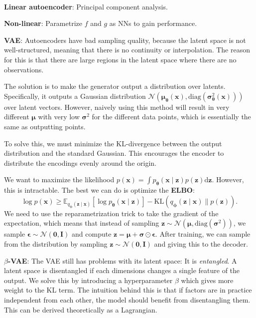 \documentclass{article}
\newcommand{\E}{\mathbb{E}}
\renewcommand{\vec}[1]{\bm{#1}}
\newcommand{\mat}[1]{\bm{#1}}
\newenvironment{topic}[1]
{\textbf{\sffamily \colorbox{black}{\rlap{\textbf{\textcolor{white}{#1}}}\hspace{\linewidth}\hspace{-2\fboxsep}}} \\ \vspace{0.2cm}}
{}
\begin{document}
\begin{multicols*}{2}
\begin{topic}{Autoencoders}
        \textbf{Linear autoencoder}: Principal component analysis.

        \textbf{Non-linear}: Parametrize $f$ and $g$ as NNs to gain performance.

        \textbf{VAE}: Autoencoders have bad sampling quality, because the latent space is not
        well-structured, meaning that there is no continuity or interpolation. The reason for this is
        that there are large regions in the latent space where there are no observations.

        The solution is to make the generator output a distribution over latents. Specifically, it outputs
        a Gaussian distribution $\mathcal{N}(\vec{\mu}_{\vec{\theta}}(\vec{x}),
            \mathrm{diag}(\vec{\sigma}_{\vec{\theta}}^2(\vec{x})))$ over latent vectors. However, naively using
        this method will result in very different $\vec{\mu}$ with very low $\vec{\sigma}^2$ for the
        different data points, which is essentially the same as outputting points.

        To solve this, we must minimize the KL-divergence between the output distribution and the standard
        Gaussian. This encourages the encoder to distribute the encodings evenly around the origin.

        We want to maximize the likelihood $p(\vec{x}) = \int p_{\vec{\theta}}(\vec{x} \mid \vec{z})
            p(\vec{z}) \mathrm{d}\vec{z}$. However, this is intractable. The best we can do is optimize the
        \textbf{ELBO}: \[
            \log p(\vec{x}) \geq \E_{q_{\vec{\phi}}(\vec{z} \mid \vec{x})} [\log p_{\vec{\theta}}(\vec{x} \mid \vec{z})] - \mathrm{KL}(q_{\vec{\phi}}(\vec{z} \mid \vec{x}) \lVert p(\vec{z})).
        \]
        We need to use the reparametrization trick to take the gradient of the expectation, which means
        that instead of sampling $\vec{z} \sim \mathcal{N}(\vec{\mu}, \mathrm{diag}(\vec{\sigma}^2))$, we
        sample $\vec{\epsilon} \sim \mathcal{N}(\vec{0}, \mat{I})$ and compute $\vec{z} = \vec{\mu} +
            \vec{\sigma} \odot \vec{\epsilon}$. After training, we can sample from the distribution by sampling
        $\vec{z} \sim \mathcal{N}(\vec{0}, \mat{I})$ and giving this to the decoder.

        \textbf{$\beta$-VAE}: The VAE still has problems with its latent space: It is \textit{entangled}. A
        latent space is disentangled if each dimensions changes a single feature of the output. We
        solve this by introducing a hyperparameter $\beta$ which gives more weight to the KL term. The
        intuition behind this is that if factors are in practice independent from each other, the
        model should benefit from disentangling them. This can be derived theoretically as a
        Lagrangian.


\end{topic}
\end{multicols*}
\end{document}
